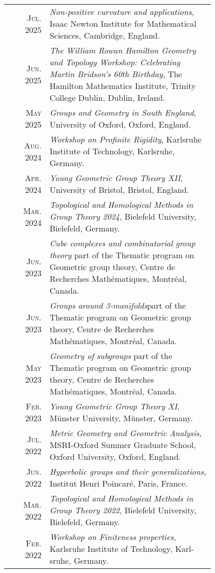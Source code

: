 \documentclass[a4paper,11pt]{article} %
\begin{document}
\begin{longtable}{rp{0.8\linewidth}}

	\textsc{Jul. 2025} &\emph{Non-positive curvature and applications}, Isaac Newton Institute for Mathematical Sciences, Cambridge, England. \\
	
	\textsc{Jun. 2025} & \emph{The William Rowan Hamilton Geometry and Topology Workshop: Celebrating Martin Bridson's 60th Birthday}, The Hamilton Mathematics Institute, Trinity College Dublin, Dublin, Ireland. \\
	
	\textsc{May 2025} & \emph{Groups and Geometry in South England}, University of Oxford, Oxford, England. \\

    \textsc{Aug. 2024} & \emph{Workshop on Profinite Rigidity}, Karlsruhe Institute of Technology, Karlsruhe,
    Germany. \\

    \textsc{Apr. 2024} & \emph{Young Geometric Group Theory XII}, University of Bristol, Bristol, England.\\

    \textsc{Mar. 2024} & \emph{Topological and Homological Methods in Group Theory 2024}, Bielefeld
    University, Bielefeld, Germany.\\

    \textsc{Jun. 2023} & \emph{Cube complexes and combinatorial group theory} part of the Thematic program on Geometric group theory, Centre de Recherches Mathématiques, Montréal, Canada.\\

    \textsc{Jun. 2023} & \emph{Groups around 3-manifolds}part of the Thematic program on Geometric group theory,
    Centre de Recherches Mathématiques, Montréal, Canada.\\

    \textsc{May 2023} & \emph{Geometry of subgroups} part of the Thematic program on Geometric group theory, Centre
    de Recherches Mathématiques, Montréal, Canada.\\

    \textsc{Feb. 2023} & \emph{Young Geometric Group Theory XI}, Münster University, Münster, Germany.\\

    \textsc{Jul. 2022} & \emph{Metric Geometry and Geometric Analysis}, MSRI-Oxford Summer Graduate
    School, Oxford University, Oxford, England.\\

    \textsc{Jun. 2022} & \emph{Hyperbolic groups and their generalizations}, Institut Henri Poincaré, Paris,
    France.\\

    \textsc{Mar. 2022} & \emph{Topological and Homological Methods in Group Theory 2022}, Bielefeld University, Bielefeld, Germany.\\
    
    \textsc{Feb. 2022} & \emph{Workshop on Finiteness properties}, Karlsruhe Institute of Technology, Karl-
    sruhe, Germany.\\

\end{longtable}
\end{document}

